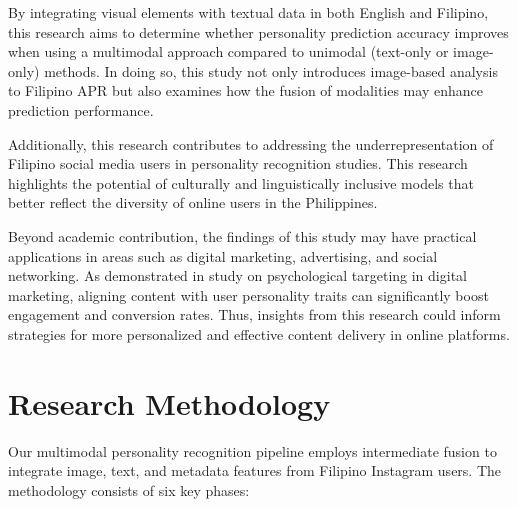 By integrating visual elements with textual data in both English and Filipino, this research aims to determine whether personality prediction accuracy improves when using a multimodal approach compared to unimodal (text-only or image-only) methods. In doing so, this study not only introduces image-based analysis to Filipino APR but also examines how the fusion of modalities may enhance prediction performance.

Additionally, this research contributes to addressing the underrepresentation of Filipino social media users in personality recognition studies. This research highlights the potential of culturally and linguistically inclusive models that better reflect the diversity of online users in the Philippines.

Beyond academic contribution, the findings of this study may have practical applications in areas such as digital marketing, advertising, and social networking. As demonstrated in \citet{Matz2017} study on psychological targeting in digital marketing, aligning content with user personality traits can significantly boost engagement and conversion rates. Thus, insights from this research could inform strategies for more personalized and effective content delivery in online platforms.




%
%

\section{Research Methodology}
\label{sec:methodology}


Our multimodal personality recognition pipeline employs intermediate fusion to integrate image, text, and metadata features from Filipino Instagram users. The methodology consists of six key phases:

